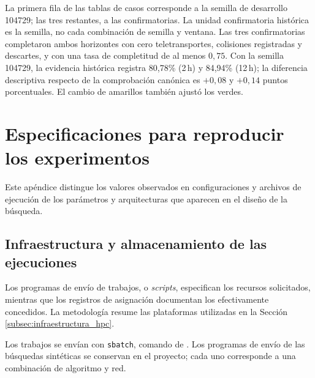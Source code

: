 \begin{table}[H]\centering\small
\caption[Evidencia histórica de 5 s: resultados por semilla en la ventana de 2 h.]{Evidencia histórica de 5\,s: resultados por semilla en la ventana de 2\,h.}\label{tab:mendoza_casos_balance_2h}

\end{table}
\begin{table}[H]\centering\small
\caption[Evidencia histórica de 5 s: resultados por semilla en la ventana de 12 h.]{Evidencia histórica de 5\,s: resultados por semilla en la ventana de 12\,h.}\label{tab:mendoza_casos_balance_12h}

\end{table}

La primera fila de las tablas de casos corresponde a la semilla de desarrollo 104729; las tres restantes, a las confirmatorias. La unidad confirmatoria histórica es la semilla, no cada combinación de semilla y ventana. Las tres confirmatorias completaron ambos horizontes con cero teletransportes, colisiones registradas y descartes, y con una tasa de completitud de al menos $0{,}75$. Con la semilla 104729, la evidencia histórica registra 80,78\% (2\,h) y 84,94\% (12\,h); la diferencia descriptiva respecto de la comprobación canónica es $+0{,}08$ y $+0{,}14$ puntos porcentuales. El cambio de amarillos también ajustó los verdes.

\section{Especificaciones para reproducir los experimentos}
\label{sec:apendice_reproduccion}

Este apéndice distingue los valores observados en configuraciones y archivos de ejecución de los parámetros y arquitecturas que aparecen en el diseño de la búsqueda.

\subsection{Infraestructura y almacenamiento de las ejecuciones}
\label{sec:infraestructura_apendice}

Los programas de envío de trabajos, o \textit{scripts}, especifican los recursos solicitados, mientras que los registros de asignación documentan los efectivamente concedidos. La metodología resume las plataformas utilizadas en la Sección \ref{subsec:infraestructura_hpc}.

Los trabajos se envían con \texttt{sbatch}, comando de . Los programas de envío de las búsquedas sintéticas se conservan en el proyecto; cada uno corresponde a una combinación de algoritmo y red.

